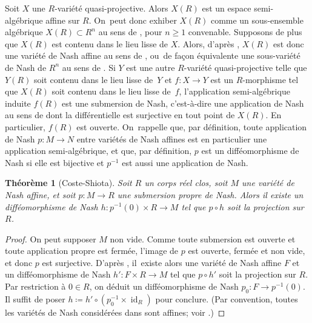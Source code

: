\documentclass[JEP,XML,SOM,Unicode,francais,published]{cedram}
\newtheorem{thm}{Théorème}[section]
\theoremstyle{definition}
\newcommand{\on}[1]{\operatorname{#1}}
\begin{document}
Soit $X$ une $R$-variété quasi-projective. Alors $X(R)$ est un espace semi-algébrique affine sur $R$. On~peut donc exhiber $X(R)$ comme un sous-ensemble algébrique \hbox{$X(R)\subset R^n$} au sens de \cite[Def.\,2.1.1]{bochnak1998real}, pour $n\geq 1$ convenable. Supposons de plus que $X(R)$ est contenu dans le lieu lisse de $X$. Alors, d'après \cite[Prop.\,3.3.11]{bochnak1998real}, $X(R)$ est donc une variété de Nash affine au sens de \cite[p.\,351]{coste1992nash}, ou~de façon équivalente une sous-variété de Nash de $R^n$ au sens de \cite[Def.\,2.9.9]{bochnak1998real}. Si $Y$ est une autre $R$-variété quasi-projective telle que $Y(R)$ soit contenu dans le lieu lisse de~$Y$ et $f\colon X\to Y$ est un $R$-morphisme tel que $X(R)$ soit contenu dans le lieu lisse de~$f$, l'application semi-algébrique induite $f(R)$ est une submersion de Nash, c'est-à-dire une application de Nash au sens de \cite[Def.\,2.9.9]{bochnak1998real} dont la différentielle est surjective en tout point de $X(R)$. En particulier, $f(R)$ est ouverte. On~rappelle que, par définition, toute application de Nash $p\colon M\to N$ entre variétés de Nash affines est en particulier une application semi-algébrique, et que, par définition, $p$ est un difféomorphisme de Nash si elle est bijective et $p^{-1}$ est aussi une application de Nash.

\begin{thm}[Coste-Shiota]\label{coste-shiota-thom}
Soit $R$ un corps réel clos, soit $M$ une variété de Nash affine, et soit $p\colon M\to R$ une submersion propre de Nash. Alors il existe un difféomorphisme de Nash $h\colon p^{-1}(0)\times R\to M$ tel que $p\circ h$ soit la projection sur $R$.
\end{thm}

\begin{proof}
On peut supposer $M$ non vide. Comme toute submersion est ouverte et toute application propre est fermée, l'image de $p$ est ouverte, fermée et non vide, et donc $p$ est surjective. D'après \cite[Th.\,A, Th.\,2.4(iii')]{coste1992nash}, il~existe alors une variété de Nash affine $F$ et un difféomorphisme de Nash $h'\colon F\times R\to M$ tel que $p\circ h'$ soit la projection sur $R$. Par restriction à $0\in R$, on déduit un difféomorphisme de Nash $p_0\colon F\to p^{-1}(0)$. Il suffit de poser $h\coloneqq h'\circ (p_0^{-1}\times \on{id}_R)$ pour conclure. (Par convention, toutes les variétés de Nash considérées dans \cite{coste1992nash} sont affines; voir \cite[p.\,351]{coste1992nash}.)
\end{proof}
\end{document}
